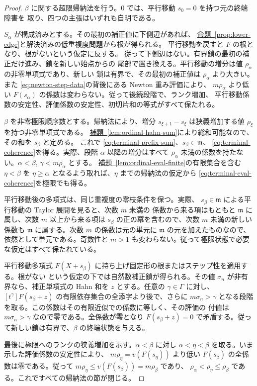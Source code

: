 \documentclass[11pt,uplatex,dvipdfmx]{jsarticle}
\newcommand{\Val}{v}
\newcommand{\namedref}[2]{\hyperref[#2]{#1~\ref*{#2}}}
\theoremstyle{proofnote}
\begin{document}
\begin{proof}
  \(\beta\) に関する超限帰納法を行う。\(0\) では、平行移動 \(s_0=0\) を持つ元の終端障害を
  取り、四つの主張はいずれも自明である。

  \(S_\alpha\) が構成済みとする。その最初の補正値に下側辺があれば、
  \namedref{命題}{prop:lower-edge}と解決済みの低重複度問題から根が得られる。
  平行移動を戻すと \(F\) の根となり、根がないという仮定に反する。
  従って下側辺はない。有界鎖の最初の補正だけ進み、鎖を新しい始点からの
  尾部で置き換える。平行移動の増分は値 \(\rho_\alpha\) の非零単項式であり、新しい
  鎖は有界で、その最初の補正値は \(\rho_\alpha\) より大きい。また
  \eqref{eq:newton-step-data}の背後にある Newton 重み評価により、
  \(m\rho_\alpha\) より低い \(F(s_\alpha)\) の係数は変わらない。従って後続段階で、ランク増加、
  平行移動係数の安定性、評価係数の安定性、初切片和の等式がすべて保たれる。

  \(\beta\) を非零極限順序数とする。帰納法により、増分
  \(s_{\xi+1}-s_\xi\) は狭義増加する値 \(\rho_\xi\) を持つ非零単項式である。
  \namedref{補題}{lem:ordinal-hahn-sum}により総和可能なので、その和を \(s_\beta\) と定める。
  これで \eqref{eq:terminal-prefix-sum}、\(s_\beta\in\mathfrak m\)、
  \eqref{eq:terminal-coherence}を得る。実際、段階 \(\alpha\) 以降の増分はすべて
  \(\rho_\alpha\) 未満の係数を持たない。\(\alpha<\beta\), \(\gamma<m\rho_\alpha\) とする。
  \namedref{補題}{lem:ordinal-eval-finite}の有限集合を含む \(\eta<\beta\) を
  \(\eta\ge\alpha\) となるよう取れば、\(\eta\) までの帰納法の仮定から
  \eqref{eq:terminal-eval-coherence}を極限でも得る。

  平行移動後の多項式は、同じ重複度の零枝条件を保つ。実際、
  \(s_\beta\in\mathfrak m\) による平行移動の Taylor 展開を見ると、次数 \(m\) 未満の
  係数から来る項はもともと \(\mathfrak m\) に属し、次数 \(m\) 以上から来る項は
  \(s_\beta\) の正の冪を含むので、次数 \(m\) 未満の新しい係数も
  \(\mathfrak m\) に属する。次数 \(m\) の係数は元の単元に
  \(\mathfrak m\) の元を加えたものなので、依然として単元である。奇数性と
  \(m>1\) も変わらない。従って極限状態で必要な仮定はすべて保たれている。

  平行移動多項式 \(F(X+s_\beta)\) に持ち上げ固定形の根またはステップ性を適用する。根がない
  という仮定の下では自然数補正鎖が得られる。その値 \(\sigma_n\) が非有界なら、補正単項式の
  Hahn 和を \(z\) とする。任意の \(\gamma\in\Gamma\) に対し、
  \([t^\gamma]F(s_\beta+z)\) の有限依存集合の全添字より後で、さらに
  \(m\sigma_n>\gamma\) となる段階を取る。この係数はその有限近似での係数に等しく、その評価の
  付値は \(m\sigma_n>\gamma\) なので零である。全係数が零となり
  \(F(s_\beta+z)=0\) で矛盾する。従って新しい鎖は有界で、\(\beta\) の終端状態を与える。

  最後に極限へのランクの狭義増加を示す。\(\alpha<\beta\) に対し
  \(\alpha<\eta<\beta\) を取る。いま示した評価係数の安定性により、
  \(m\rho_\eta=\Val(F(s_\eta))\) より低い \(F(s_\beta)\) の全係数は零である。従って
  \(m\rho_\eta\le\Val(F(s_\beta))=m\rho_\beta\) であり、
  \(\rho_\alpha<\rho_\eta\le\rho_\beta\) である。これですべての帰納法の節が閉じる。
\end{proof}
\end{document}
